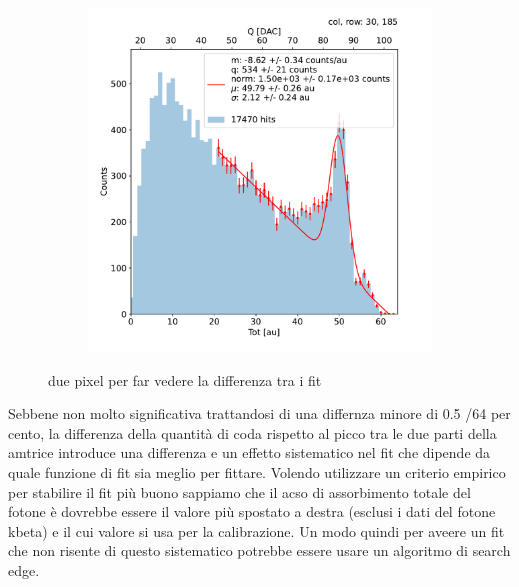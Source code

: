\begin{figure}[h!]
\begin{subfigure}{.5\textwidth}
            \includegraphics[width=.99\linewidth]{figures/charaterization/fit_line_gauss_r185.pdf}
            \label{fig:}
            \end{subfigure}
            \caption{due pixel per far vedere la differenza tra i fit}
        \end{figure}    
        
        Sebbene non molto significativa trattandosi di una differnza minore di 0.5 /64  per cento, la differenza della quantità di coda rispetto al picco tra le due parti della amtrice introduce una differenza e un effetto sistematico nel fit che dipende da quale funzione di fit sia meglio per fittare. 
        Volendo utilizzare un criterio empirico per stabilire il fit più buono sappiamo che il acso di assorbimento totale del fotone è dovrebbe essere il valore più spostato a destra (esclusi i dati del fotone kbeta) e il cui valore si usa per la calibrazione. 
        Un modo quindi per aveere un fit che non risente di questo sistematico potrebbe essere usare un algoritmo di search edge. 
        
